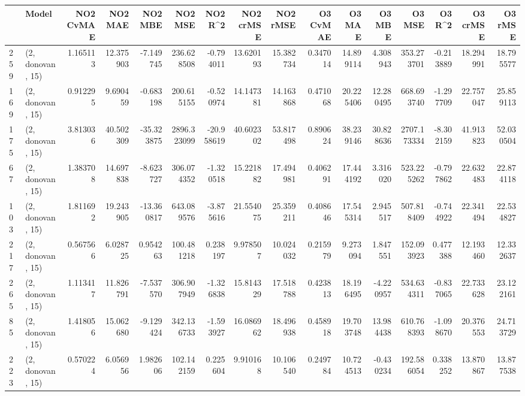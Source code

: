 \begin{tabular}{llrrrrrrrrrrrrrr}
\toprule
{} &             Model &  NO2 CvMAE &    NO2 MAE &    NO2 MBE &      NO2 MSE &    NO2 R\textasciicircum2 &  NO2 crMSE &   NO2 rMSE &  O3 CvMAE &     O3 MAE &     O3 MBE &       O3 MSE &    O3 R\textasciicircum2 &   O3 crMSE &    O3 rMSE \\
\midrule
259 &  (2, donovan, 15) &   1.165113 &  12.375903 &  -7.149745 &   236.628508 &  -0.794011 &  13.620193 &  15.382734 &  0.347014 &  14.899114 &   4.308943 &   353.273701 & -0.213889 &  18.294991 &  18.795577 \\
169 &  (2, donovan, 15) &   0.912295 &   9.690459 &  -0.683198 &   200.615155 &  -0.520974 &  14.147381 &  14.163868 &  0.471068 &  20.225406 &  12.280495 &   668.693740 & -1.297709 &  22.757047 &  25.859113 \\
175 &  (2, donovan, 15) &   3.813036 &  40.502309 & -35.323875 &  2896.323099 & -20.958619 &  40.602302 &  53.817498 &  0.890624 &  38.239146 &  30.828636 &  2707.173334 & -8.302159 &  41.913823 &  52.030504 \\
67  &  (2, donovan, 15) &   1.383708 &  14.697838 &  -8.623727 &   306.074352 &  -1.320518 &  15.221882 &  17.494981 &  0.406291 &  17.444192 &   3.316020 &   523.225262 & -0.797862 &  22.632483 &  22.874118 \\
103 &  (2, donovan, 15) &   1.811692 &  19.243905 & -13.360817 &   643.089576 &  -3.875616 &  21.554075 &  25.359211 &  0.408646 &  17.545314 &   2.945517 &   507.818409 & -0.744922 &  22.341494 &  22.534827 \\
217 &  (2, donovan, 15) &   0.567566 &   6.028725 &   0.954263 &   100.481218 &   0.238197 &   9.978507 &  10.024032 &  0.215979 &   9.273094 &   1.847551 &   152.093923 &  0.477388 &  12.193460 &  12.332637 \\
265 &  (2, donovan, 15) &   1.113417 &  11.826791 &  -7.537570 &   306.907949 &  -1.326838 &  15.814329 &  17.518788 &  0.423813 &  18.196495 &  -4.220957 &   534.634311 & -0.837065 &  22.733628 &  23.122161 \\
85  &  (2, donovan, 15) &   1.418056 &  15.062680 &  -9.129424 &   342.136733 &  -1.593927 &  16.086962 &  18.496938 &  0.458918 &  19.703748 &  13.984438 &   610.768393 & -1.098670 &  20.376553 &  24.713729 \\
223 &  (2, donovan, 15) &   0.570224 &   6.056956 &   1.982606 &   102.142159 &   0.225604 &   9.910168 &  10.106540 &  0.249784 &  10.724513 &  -0.430234 &   192.586054 &  0.338252 &  13.870867 &  13.877538 \\

\end{tabular}
